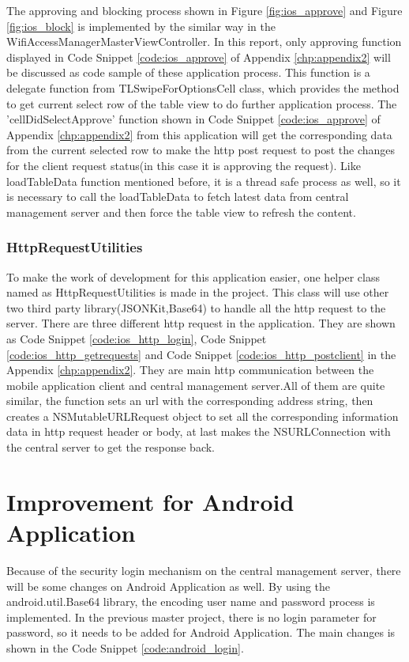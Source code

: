 \par The approving and blocking process shown in Figure \ref{fig:ios_approve} and Figure \ref{fig:ios_block} is implemented by the similar way in the WifiAccessManagerMasterViewController. In this report, only approving function displayed in Code Snippet \ref{code:ios_approve} of Appendix \ref{chp:appendix2} will be discussed as code sample of these application process. This function is a delegate function from TLSwipeForOptionsCell class, which provides the method to get current select row of the table view to do further application process. The 'cellDidSelectApprove' function shown in Code Snippet \ref{code:ios_approve} of Appendix \ref{chp:appendix2} from this application will get the corresponding data from the current selected row to make the \gls{http} post request to post the changes for the client request status(in this case it is approving the request). Like loadTableData function mentioned before, it is a thread safe process as well, so it is necessary to call the loadTableData to fetch latest data from central management server and then force the table view to refresh the content.

\subsubsection{HttpRequestUtilities}
\par To make the work of development for this application easier, one helper class named as HttpRequestUtilities is made in the project. This class will use other two third party library(JSONKit,Base64) to handle all the \gls{http} request to the server. There are three different \gls{http} request in the application. They are shown as Code Snippet \ref{code:ios_http_login}, Code Snippet \ref{code:ios_http_getrequests} and Code Snippet \ref{code:ios_http_postclient} in the Appendix \ref{chp:appendix2}. They are main \gls{http} communication between the mobile application client and central management server.All of them are quite similar, the function sets an \gls{url} with the corresponding address string, then creates a  NSMutableURLRequest object to set all the corresponding information data in \gls{http} request header or body, at last makes the NSURLConnection with the central server to get the response back.

\section{Improvement for Android Application}
\par Because of the security login mechanism on the central management server, there will be some changes on Android Application as well. By using the android.util.Base64 library, the encoding user name and password process is implemented. In the previous master project, there is no login parameter for password, so it needs to be added for Android Application. The main changes is shown in the Code Snippet \ref{code:android_login}.

